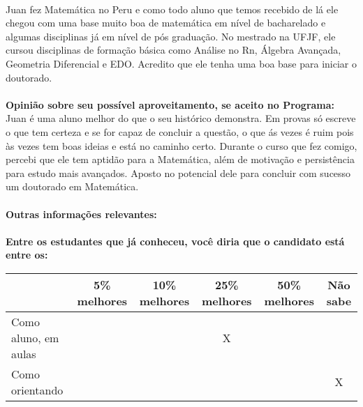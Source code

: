 \documentclass[11pt]{article}
\begin{document}
\\Juan fez Matemática no Peru e como todo aluno que temos recebido de lá ele chegou com uma base muito boa de matemática em nível de bacharelado e algumas disciplinas já em nível de pós graduação. No  mestrado na UFJF, ele cursou disciplinas de formação básica como Análise no Rn, Álgebra Avançada, Geometria Diferencial e EDO. Acredito que ele tenha uma boa base para iniciar o doutorado.\\
\\
\textbf{Opinião sobre seu possível aproveitamento, se aceito no Programa:}
\\Juan é uma aluno melhor do que o seu histórico demonstra. Em provas só escreve o que tem certeza e se for capaz de concluir a questão, o que ás vezes é ruim pois  às vezes tem boas ideias e está no caminho certo. Durante o curso que fez comigo, percebi que ele tem aptidão para a Matemática, além de motivação e persistência  para estudo mais avançados. Aposto no potencial dele para concluir com sucesso um doutorado em Matemática.\\ 
\\
\textbf{Outras informações relevantes:} \\
\\[0.3cm]
\textbf{Entre os estudantes que já conheceu, você diria que o candidato está entre os:}
\\
\begin{tabular}{|l|c|c|c|c|c|}
\hline
 & 5\% melhores & 10\% melhores & 25\% melhores & 50\% melhores & Não sabe \\
\hline
Como aluno, em aulas &  &  & X &  & \\
\hline
Como orientando &  &  &  &  & X\\
\hline
\end{tabular}
\end{document}
